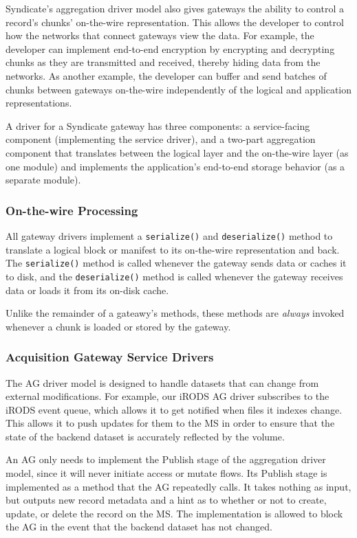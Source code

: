 Syndicate's aggregation driver model also gives gateways the ability to
control a record's chunks' on-the-wire representation.  This allows the
developer to control how the networks that connect gateways view the data.  For
example, the developer can implement end-to-end encryption by encrypting and
decrypting chunks as they are transmitted and received, thereby hiding
data from the networks.  As another example, the developer can buffer and send
batches of chunks between gateways on-the-wire independently of the logical and
application representations.

A driver for a Syndicate gateway has three components:  a service-facing
component (implementing the service driver), and a two-part aggregation
component that translates between the logical layer and the on-the-wire layer
(as one module) and implements the application's end-to-end storage behavior (as
a separate module).

\subsubsection{On-the-wire Processing}

All gateway drivers implement a \texttt{serialize()} and \texttt{deserialize()}
method to translate a logical block or manifest to its on-the-wire
representation and back.  The \texttt{serialize()} method is called whenever the gateway sends
data or caches it to disk, and the \texttt{deserialize()} method is called
whenever the gateway receives data or loads it from its on-disk cache.

Unlike the remainder of a gateawy's methods, these methods are \emph{always}
invoked whenever a chunk is loaded or stored by the gateway.

\subsubsection{Acquisition Gateway Service Drivers}

The AG driver model is designed to handle datasets that can change from
external modifications.  For example, our iRODS AG driver
subscribes to the iRODS event queue, which allows it to get notified
when files it indexes change.  This allows it to push updates for them to the MS
in order to ensure that the state of the backend dataset is accurately reflected
by the volume.

 An AG only needs to implement the Publish stage of
the aggregation driver model, since it will never initiate access or mutate
flows.  Its Publish stage is implemented as a method that the AG repeatedly
calls.  It takes nothing as input, but outputs new record metadata and a
hint as to whether or not to create, update, or delete the record on the MS.  The
implementation is allowed to block the AG in the event that the backend dataset
has not changed.

